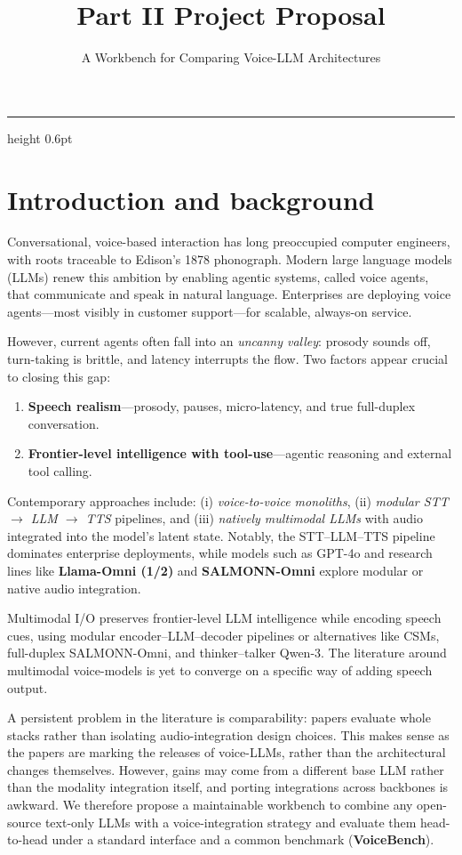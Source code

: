 \documentclass[11pt,a4paper]{scrartcl}
\title{\vspace{-1.2em}\textbf{Part II Project Proposal}}
\subtitle{A Workbench for Comparing Voice-LLM Architectures}
\author{} %
\date{}   %
\begin{document}
\maketitle
\vspace{-1.5em}
\hrule height 0.6pt \vspace{0.8em}

\section{Introduction and background}

Conversational, voice-based interaction has long preoccupied computer engineers, with roots traceable to Edison’s 1878 phonograph. Modern large language models (LLMs) renew this ambition by enabling agentic systems, called voice agents, that communicate and speak in natural language. Enterprises are deploying voice agents—most visibly in customer support—for scalable, always-on service.

However, current agents often fall into an \emph{uncanny valley}: prosody sounds off, turn-taking is brittle, and latency interrupts the flow. Two factors appear crucial to closing this gap:
\begin{enumerate}
  \item \textbf{Speech realism}—prosody, pauses, micro-latency, and true full-duplex conversation.
  \item \textbf{Frontier-level intelligence with tool-use}—agentic reasoning and external tool calling.
\end{enumerate}

Contemporary approaches include: (i) \emph{voice-to-voice monoliths}, (ii) \emph{modular STT $\to$ LLM $\to$ TTS} pipelines, and (iii) \emph{natively multimodal LLMs} with audio integrated into the model’s latent state. Notably, the STT–LLM–TTS pipeline dominates enterprise deployments, while models such as GPT-4o and research lines like \textbf{Llama-Omni (1/2)} and \textbf{SALMONN-Omni} explore modular or native audio integration.

Multimodal I/O preserves frontier-level LLM intelligence while encoding speech cues, using modular encoder–LLM–decoder pipelines or alternatives like CSMs, full-duplex SALMONN-Omni, and thinker–talker Qwen-3. The literature around multimodal voice-models is yet to converge on a specific way of adding speech output.

A persistent problem in the literature is comparability: papers evaluate whole stacks rather than isolating audio-integration design choices. This makes sense as the papers are marking the releases of voice-LLMs, rather than the architectural changes themselves. However, gains may come from a different base LLM rather than the modality integration itself, and porting integrations across backbones is awkward. We therefore propose a maintainable workbench to combine any open-source text-only LLMs with a voice-integration strategy and evaluate them head-to-head under a standard interface and a common benchmark (\textbf{VoiceBench}).
\end{document}
